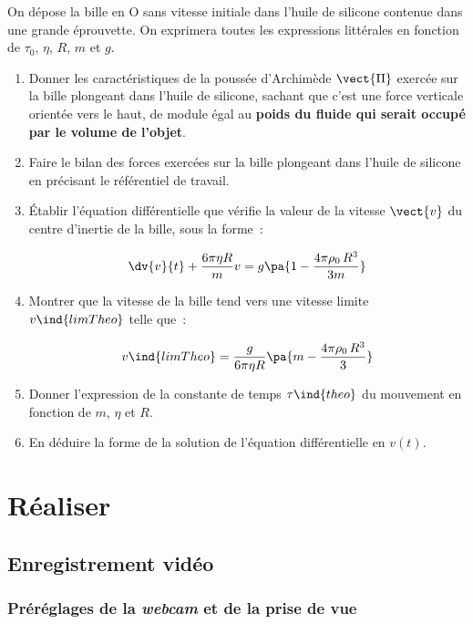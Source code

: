 \documentclass[a4paper, 11pt, final, garamond]{book}
\begin{document}
\bigbreak

On dépose la bille en O sans vitesse initiale dans l'huile de silicone contenue
dans une grande éprouvette. On exprimera  toutes les expressions littérales en
fonction de $\tau_0$, $\eta$, $R$, $m$ et $g$.

\bigbreak

\begin{enumerate}[label=\clenumi]
    \item Donner les caractéristiques de la poussée d'Archimède $\vect{\Pi}$
        exercée sur la bille plongeant dans l'huile de silicone, sachant que
        c'est une force verticale orientée vers le haut, de module égal au
        \textbf{poids du fluide qui serait occupé par le volume de l'objet}.
    \item Faire le bilan des forces exercées sur la bille plongeant dans l'huile
        de silicone en précisant le référentiel de travail.
    \item Établir l'équation différentielle que vérifie la valeur de la vitesse
        $\vect{v}$ du centre d'inertie de la bille, sous la forme~: 
 
        \[
            \dv{v}{t} + \frac{6\pi \eta R}{m}v = g\pa{1-\frac{4\pi \rho_0 \,
            R^3}{3m}}
        \]
    \item Montrer que la vitesse de la bille tend vers une vitesse limite
        $v\ind{limTheo}$  telle que~:

        \[
            v\ind{limTheo} = \frac{g}{6\pi \eta R} \pa{m-\frac{4\pi \rho_0 \, R^3}{3}}
        \]
    \item Donner l'expression de la constante de temps $\tau\ind{theo}$ du
        mouvement en fonction de $m$, $\eta$ et $R$.
    \item En déduire la forme de la solution de l'équation différentielle en $v(t)$. 
\end{enumerate}

\section{Réaliser}
\subsection{Enregistrement vidéo}

\subsubsection{Préréglages de la \textit{webcam} et de la prise de vue}
\end{document}
